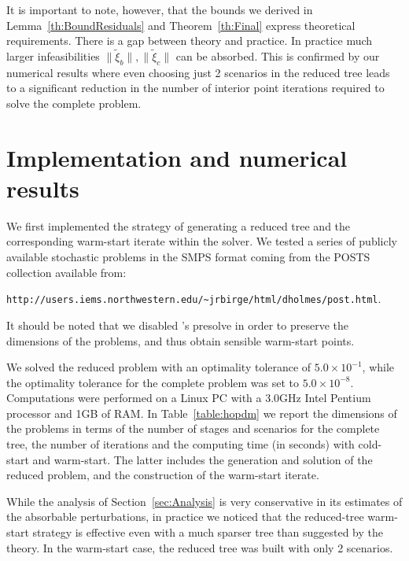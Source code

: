 It is important to note, however,
that the bounds we derived in Lemma~\ref{th:BoundResiduals}
and Theorem~\ref{th:Final} express theoretical requirements.
There is a gap between theory and
practice. In practice much larger infeasibilities 
$\|\tilde{\xi}_b\|, \|\tilde{\xi}_c\|$ can be absorbed. This is
confirmed by our numerical results where even choosing just 2
scenarios in the reduced tree leads to a significant reduction in the
number of interior point iterations required to solve the complete problem.


%
%
\section{Implementation and numerical results}
\label{sec:Results}

We first implemented the strategy of generating a reduced tree and 
the corresponding warm-start iterate within the \HOPDM \cite{Gondzio96} 
solver. We tested a series of publicly available stochastic problems in 
the SMPS format \cite{SMPS} coming from the POSTS collection 
available from:
\begin{center}
{\tt http://users.iems.northwestern.edu/\~{}jrbirge/html/dholmes/post.html}.
\end{center}
%
%
It should be noted that we disabled \HOPDM's presolve %
in order to preserve the dimensions of the problems, and thus obtain 
sensible warm-start points.

We solved the reduced problem with an optimality tolerance of 
$5.0\times 10^{-1}$, while the optimality tolerance for the complete 
problem was set to $5.0\times 10^{-8}$. 
Computations were performed on a Linux PC with a 3.0GHz Intel Pentium 
processor and 1GB of RAM.
In Table~\ref{table:hopdm} we report the dimensions of the problems 
in terms of the number of stages and scenarios for the complete 
tree, the number of iterations and the computing time (in seconds) 
with cold-start and warm-start. The latter includes the generation 
and solution of the reduced problem, and the construction of the 
warm-start iterate.

While the analysis of Section~\ref{sec:Analysis} is very conservative
in its estimates of the absorbable perturbations, in practice we noticed
that the reduced-tree warm-start strategy is effective even with
a much sparser tree than suggested by the theory.
In the warm-start case, the reduced tree was built with only 2 scenarios.

